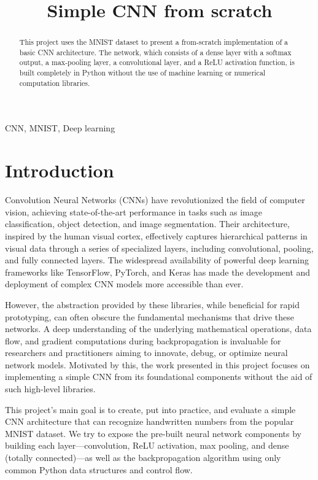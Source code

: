 \documentclass[conference]{IEEEtran}
\begin{document}
\title{Simple CNN from scratch}



\author{
}

\maketitle

\begin{abstract}
This project uses the MNIST dataset to present a from-scratch implementation of a basic CNN architecture.  The network, which consists of a dense layer with a softmax output, a max-pooling layer, a convolutional layer, and a ReLU activation function, is built completely in Python without the use of machine learning or numerical computation libraries.
\end{abstract}

\begin{IEEEkeywords}
CNN, MNIST, Deep learning
\end{IEEEkeywords}

\section{Introduction}
Convolution Neural Networks (CNNs) have revolutionized the field of computer vision, achieving state-of-the-art performance in tasks such as image classification, object detection, and image segmentation. Their architecture, inspired by the human visual cortex, effectively captures hierarchical patterns in visual data through a series of specialized layers, including convolutional, pooling, and fully connected layers. The widespread availability of powerful deep learning frameworks like TensorFlow, PyTorch, and Keras has made the development and deployment of complex CNN models more accessible than ever.

However, the abstraction provided by these libraries, while beneficial for rapid prototyping, can often obscure the fundamental mechanisms that drive these networks. A deep understanding of the underlying mathematical operations, data flow, and gradient computations during backpropagation is invaluable for researchers and practitioners aiming to innovate, debug, or optimize neural network models. Motivated by this, the work presented in this project focuses on implementing a simple CNN from its foundational components without the aid of such high-level libraries.

This project's main goal is to create, put into practice, and evaluate a simple CNN architecture that can recognize handwritten numbers from the popular MNIST dataset. We try to expose the pre-built neural network components by building each layer—convolution, ReLU activation, max pooling, and dense (totally connected)—as well as the backpropagation algorithm using only common Python data structures and control flow.
\end{document}
